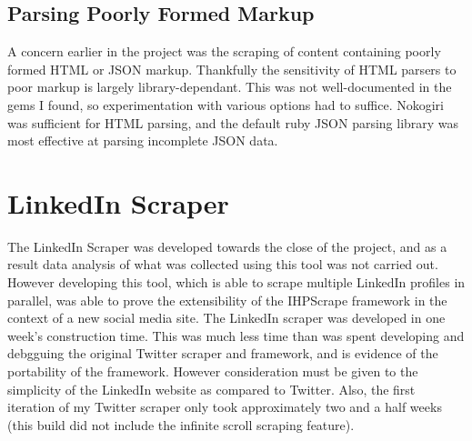 \subsection{Parsing Poorly Formed Markup}

A concern earlier in the project was the scraping of content containing poorly formed HTML or JSON markup. Thankfully the sensitivity of HTML parsers to poor markup is largely library-dependant. This was not well-documented in the gems I found, so experimentation with various options had to suffice. Nokogiri was sufficient for HTML parsing, and the default ruby JSON parsing library was most effective at parsing incomplete JSON data.










\section{LinkedIn Scraper}

The LinkedIn Scraper was developed towards the close of the project, and as a result data analysis of what was collected using this tool was not carried out. However developing this tool, which is able to scrape multiple LinkedIn profiles in parallel, was able to prove the extensibility of the IHPScrape framework in the context of a new social media site. The LinkedIn scraper was developed in one week's construction time. This was much less time than was spent developing and debgguing the original Twitter scraper and framework, and is evidence of the portability of the framework. However consideration must be given to the simplicity of the LinkedIn website as compared to Twitter. Also, the first iteration of my Twitter scraper only took approximately two and a half weeks (this build did not include the infinite scroll scraping feature). 

